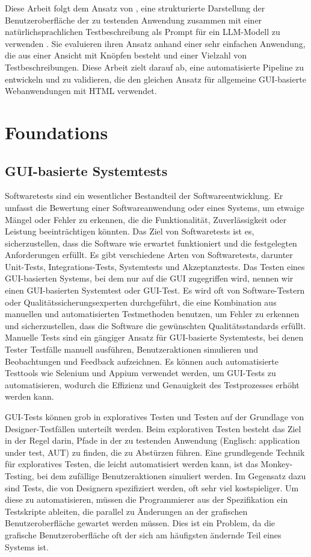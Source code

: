 Diese Arbeit folgt dem Ansatz von , eine strukturierte Darstellung der Benutzeroberfläche der zu testenden Anwendung zusammen mit einer natürlichsprachlichen Testbeschreibung als Prompt für ein LLM-Modell zu verwenden \cite{GPT3Testing}.
Sie evaluieren ihren Ansatz anhand einer sehr einfachen Anwendung, die aus einer Ansicht mit Knöpfen besteht und einer Vielzahl von Testbeschreibungen.
Diese Arbeit zielt darauf ab, eine automatisierte Pipeline zu entwickeln und zu validieren, die den gleichen Ansatz für allgemeine GUI-basierte Webanwendungen mit HTML verwendet.

\chapter{Foundations}
\label{ch:SecondContent}

\section{GUI-basierte Systemtests}
\label{sec:SecondContent:FirstSection}
Softwaretests sind ein wesentlicher Bestandteil der Softwareentwicklung.
Er umfasst die Bewertung einer Softwareanwendung oder eines Systems, um etwaige Mängel oder Fehler zu erkennen, die die Funktionalität, Zuverlässigkeit oder Leistung beeinträchtigen könnten.
Das Ziel von Softwaretests ist es, sicherzustellen, dass die Software wie erwartet funktioniert und die festgelegten Anforderungen erfüllt.
Es gibt verschiedene Arten von Softwaretests, darunter Unit-Tests, Integrations-Tests, Systemtests und Akzeptanztests.
Das Testen eines GUI-basierten Systems, bei dem nur auf die GUI zugegriffen wird, nennen wir einen GUI-basierten Systemtest oder GUI-Test.
Es wird oft von Software-Testern oder Qualitätssicherungsexperten durchgeführt, die eine Kombination aus manuellen und automatisierten Testmethoden benutzen, um Fehler zu erkennen und sicherzustellen, dass die Software die gewünschten Qualitätsstandards erfüllt.
Manuelle Tests sind ein gängiger Ansatz für GUI-basierte Systemtests, bei denen Tester Testfälle manuell ausführen, Benutzeraktionen simulieren und Beobachtungen und Feedback aufzeichnen.
Es können auch automatisierte Testtools wie Selenium und Appium verwendet werden, um GUI-Tests zu automatisieren, wodurch die Effizienz und Genauigkeit des Testprozesses erhöht werden kann.

GUI-Tests können grob in exploratives Testen und Testen auf der Grundlage von Designer-Testfällen unterteilt werden.
Beim explorativen Testen besteht das Ziel in der Regel darin, Pfade in der zu testenden Anwendung (Englisch: application under test, AUT) zu finden, die zu Abstürzen führen.
Eine grundlegende Technik für exploratives Testen, die leicht automatisiert werden kann, ist das Monkey-Testing, bei dem zufällige Benutzeraktionen simuliert werden.
Im Gegensatz dazu sind Tests, die von Designern spezifiziert werden, oft sehr viel kostspieliger.
Um diese zu automatisieren, müssen die Programmierer aus der Spezifikation ein Testskripte ableiten, die parallel zu Änderungen an der grafischen Benutzeroberfläche gewartet werden müssen.
Dies ist ein Problem, da die grafische Benutzeroberfläche oft der sich am häufigsten ändernde Teil eines Systems ist.

